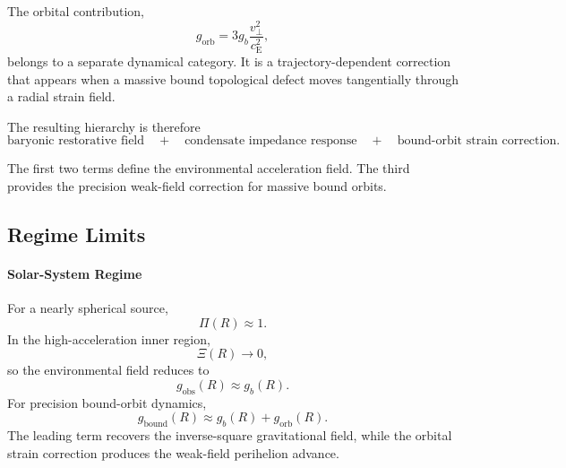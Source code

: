 The orbital contribution,
\begin{equation}
    g_{\mathrm{orb}} = 3g_b \frac{v_\perp^2}{c_{\mathrm{E}}^2},
\end{equation}
belongs to a separate dynamical category. It is a trajectory-dependent correction that appears when a massive bound topological defect moves tangentially through a radial strain field.

The resulting hierarchy is therefore
\begin{equation}
    \text{baryonic restorative field} \quad + \quad \text{condensate impedance response} \quad + \quad \text{bound-orbit strain correction}.
\end{equation}

The first two terms define the environmental acceleration field. The third provides the precision weak-field correction for massive bound orbits.

\subsection{Regime Limits}

\paragraph{Solar-System Regime}
For a nearly spherical source,
\begin{equation}
    \Pi(R) \approx 1.
\end{equation}
In the high-acceleration inner region,
\begin{equation}
    \Xi(R) \rightarrow 0,
\end{equation}
so the environmental field reduces to
\begin{equation}
    g_{\mathrm{obs}}(R) \approx g_b(R).
\end{equation}
For precision bound-orbit dynamics,
\begin{equation}
    g_{\mathrm{bound}}(R) \approx g_b(R) + g_{\mathrm{orb}}(R).
\end{equation}
The leading term recovers the inverse-square gravitational field, while the orbital strain correction produces the weak-field perihelion advance.

